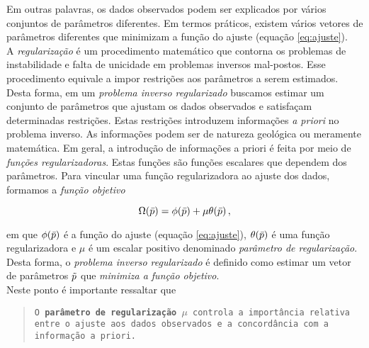 \noindent Em outras palavras, os dados observados podem ser explicados por vários
conjuntos de parâmetros diferentes. Em termos práticos, existem vários vetores
de parâmetros diferentes que minimizam a função do ajuste
(equação \ref{eq:ajuste}).
\\
\indent A {\it regularização} é um procedimento matemático que contorna os
problemas de ins\-tabilidade e falta de unicidade em problemas inversos mal-postos.
Esse procedimento equivale a impor restrições aos parâmetros a serem estimados.
Desta forma, em um {\it problema inverso regularizado} buscamos estimar um
conjunto de parâmetros que ajustam os dados observados e satisfaçam
determinadas restrições.
Estas restrições introduzem informações {\it a priori} no problema inverso.
As informações podem ser de natureza geológica ou meramente matemática.
Em geral, a introdução de informações a priori é feita por meio de {\it funções
regularizadoras}.
Estas funções são funções escalares que dependem dos parâmetros.
Para vincular uma função regularizadora ao ajuste dos dados, formamos a
{\it função objetivo}

\begin{equation}
\Omega(\bar{p}) = \phi(\bar{p}) + \mu\theta(\bar{p}) \thinspace ,
\label{eq:objetivo}
\end{equation}

\noindent em que $\phi(\bar{p})$ é a função do ajuste (equação \ref{eq:ajuste}),
$\theta(\bar{p})$ é uma função regularizadora e $\mu$ é um escalar positivo
denominado {\it parâmetro de regularização}.
Desta forma, o {\it problema inverso regularizado} é definido como estimar um
vetor de parâmetros $\tilde{p}$ que {\it minimiza a função objetivo}.
\\
\indent Neste ponto é importante ressaltar que

\begin{quote}
{\tt O {\bf parâmetro de regularização} $\mu$ controla a importância relativa
en\-tre o ajuste aos dados observados e a concordância com a infor\-ma\-ção
a priori.}
\end{quote}

